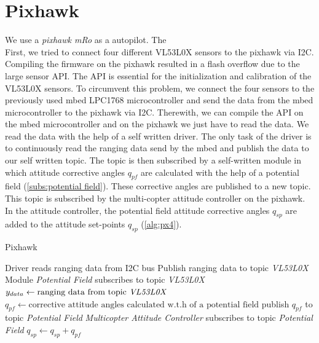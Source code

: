 \section{Pixhawk}
\label{sec:pixhawk}
We use a \textit{pixhawk mRo} as a autopilot. The  \\
First, we tried to connect four different VL53L0X sensors to the pixhawk via I2C. Compiling the firmware on the pixhawk resulted in a flash overflow due to the large sensor API. The API is essential for the initialization and calibration of the VL53L0X sensors. To circumvent this problem, we connect the four sensors to the previously used mbed LPC1768 microcontroller and send the data from the mbed microcontroller to the pixhawk via I2C. Therewith, we can compile the API on the mbed microcontroller and on the pixhawk we just have to read the data. We read the data with the help of a self written driver. The only task of the driver is to continuously read the ranging data send by the mbed and publish the data to our self written topic. The topic is then subscribed by a self-written module in which attitude corrective angles $q_{pf}$ are calculated with the help of a potential field (\cref{subs:potential field}). These corrective angles are published to a new topic. This topic is subscribed by the multi-copter attitude controller on the pixhawk. In the attitude controller, the potential field attitude corrective angles $q_{sp}$ are added to the attitude set-points $q_{sp}$ (\cref{alg:px4}).

\begin{algorithm}
	\caption{Pixhawk}\label{alg:px4}
	\begin{algorithmic}[1]
		\State Driver reads ranging data from I2C bus 
		\State Publish ranging data to topic \textit{VL53L0X}
		\State Module \textit{Potential Field} subscribes to topic \textit{VL53L0X}
		\State $y_{data}\gets \text{ranging data from topic \textit{VL53L0X}}$
		\State $q_{pf} \gets \text{corrective attitude angles calculated w.t.h of a potential field}$
		\State publish $q_{pf}$ to topic \textit{Potential Field}
		\State \textit{Multicopter Attitude Controller} subscribes to topic \textit{Potential Field}
		\State $q_{sp}\gets q_{sp}+q_{pf}$
		\EndProcedure
	\end{algorithmic}
\end{algorithm}


